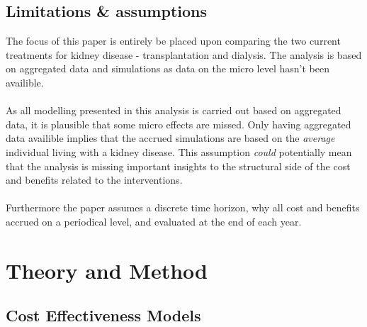 \documentclass[a4paper,12pt]{article}
\begin{document}
\subsection{Limitations \& assumptions}

The focus of this paper is entirely be placed upon comparing the two current treatments for kidney disease - transplantation and dialysis. The analysis is based on aggregated data and simulations as data on the micro level hasn't been availible.
\\\\
As all modelling presented in this analysis is carried out based on aggregated data, it is plausible that some micro effects are missed. Only having aggregated data availible implies that the accrued simulations are based on the \textit{average} individual living with a kidney disease. This assumption \textit{could} potentially mean that the analysis is missing important insights to the structural side of the cost and benefits related to the interventions.
\\\\
Furthermore the paper assumes a discrete time horizon, why all cost and benefits accrued on a periodical level, and evaluated at the end of each year.


\section{Theory and Method}

\subsection{Cost Effectiveness Models}
\end{document}
